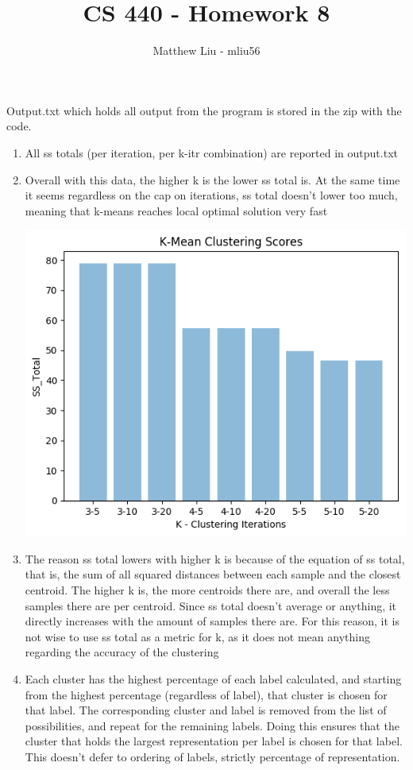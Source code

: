 \documentclass[titlepage]{article}
\title{CS 440 - Homework 8}
\author{Matthew Liu - mliu56}
\date{}
\begin{document}
\maketitle{}

Output.txt which holds all output from the program is stored in the zip with the code.\\

\begin{enumerate}
	\item All ss totals (per iteration, per k-itr combination) are reported in output.txt \\
	\item Overall with this data, the higher k is the lower ss total is. At the same time it seems regardless on the cap on iterations, ss total doesn't lower too much, meaning that k-means reaches local optimal solution very fast \\
		\centerline{\includegraphics[scale=0.5]{../graph_a.png}}
	\item The reason ss total lowers with higher k is because of the equation of ss total, that is, the sum of all squared distances between each sample and the closest centroid. The higher k is, the more centroids there are, and overall the less samples there are per centroid. Since ss total doesn't average or anything, it directly increases with the amount of samples there are. For this reason, it is not wise to use ss total as a metric for k, as it does not mean anything regarding the accuracy of the clustering \\
	\item Each cluster has the highest percentage of each label calculated, and starting from the highest percentage (regardless of label), that cluster is chosen for that label. The corresponding cluster and label is removed from the list of possibilities, and repeat for the remaining labels. Doing this ensures that the cluster that holds the largest representation per label is chosen for that label. This doesn't defer to ordering of labels, strictly percentage of representation. \\

\end{enumerate}
\end{document}
